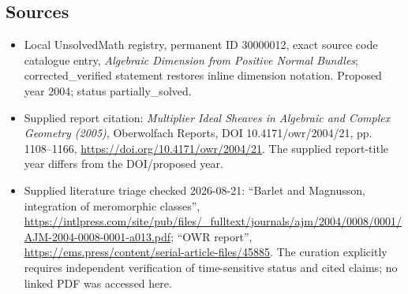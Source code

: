 \documentclass[11pt]{article}
\begin{document}
\subsection{Sources}
\begin{itemize}
\item Local UnsolvedMath registry, permanent ID 30000012, exact source code catalogue entry, \emph{Algebraic Dimension from Positive Normal Bundles}; corrected\_verified statement restores inline dimension notation. Proposed year 2004; status partially\_solved.
\item Supplied report citation: \emph{Multiplier Ideal Sheaves in Algebraic and Complex Geometry (2005)}, Oberwolfach Reports, DOI 10.4171/owr/2004/21, pp. 1108--1166, \url{https://doi.org/10.4171/owr/2004/21}. The supplied report-title year differs from the DOI/proposed year.
\item Supplied literature triage checked 2026-08-21: ``Barlet and Magnusson, integration of meromorphic classes'', \url{https://intlpress.com/site/pub/files/_fulltext/journals/ajm/2004/0008/0001/AJM-2004-0008-0001-a013.pdf}; ``OWR report'', \url{https://ems.press/content/serial-article-files/45885}. The curation explicitly requires independent verification of time-sensitive status and cited claims; no linked PDF was accessed here.
\end{itemize}
\end{document}
